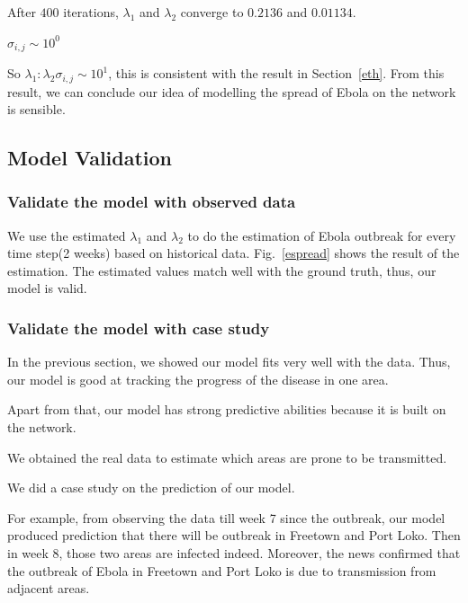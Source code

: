 \documentclass[11pt]{article}
\begin{document}
After $400$ iterations, $\lambda_1$ and $\lambda_2$ converge to $0.2136$ and $0.01134$.

$\sigma_{i,j} \sim 10^0$

So $\lambda_1 : \lambda_2 \sigma_{i,j} \sim 10^1$, this is consistent with the result in Section~\ref{eth}. From this result, we can conclude our idea of modelling the spread of Ebola on the network is sensible.

\subsection{Model Validation}

\subsubsection{Validate the model with observed data}
We use the estimated $\lambda_1$ and $\lambda_2$ to do the estimation of Ebola outbreak for every time step(2 weeks) based on historical data. Fig.~\ref{espread} shows the result of the estimation. The estimated values match well with the ground truth, thus, our model is valid.

\subsubsection{Validate the model with case study}
In the previous section, we showed our model fits very well with the data. Thus, our model is good at tracking the progress of the disease in one area. 

Apart from that, our model has strong predictive abilities because it is built on the network.

We obtained the real data to estimate which areas are prone to be transmitted.

We did a case study on the prediction of our model. 

For example, from observing the data till week 7 since the outbreak, our model produced prediction that there will be outbreak in Freetown and Port Loko. Then in week 8, those two areas are infected indeed. Moreover, the news\cite{ebolanew} confirmed that the outbreak of Ebola in Freetown and Port Loko is due to transmission from adjacent areas.
\end{document}

